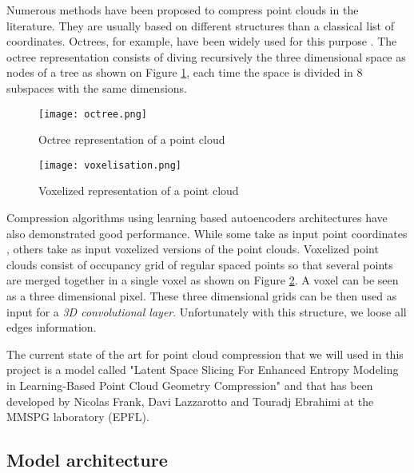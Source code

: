 \label{sec:pcc}

Numerous methods have been proposed to compress point clouds in the literature. They are usually based on different structures than a classical list of coordinates.                                
Octrees, for example, have been widely used for this purpose \cite{bib:octree}. 
The octree representation consists of diving recursively the three dimensional space as nodes of a tree as shown on Figure \ref{fig:octree}, each time the space is divided in 8 subspaces with the same dimensions.

\begin{figure}
    \centering
    \texttt{[image: octree.png]}
    \caption{Octree representation of a point cloud}
    \label{fig:octree}
\end{figure}

\begin{figure}
    \centering
    \texttt{[image: voxelisation.png]}
    \caption{Voxelized representation of a point cloud}
    \label{fig:voxelized}
\end{figure}

Compression algorithms using learning based autoencoders architectures have also demonstrated good performance. While some take as input point coordinates \cite{bib:9102866}, others take as input voxelized versions of the point clouds. 
Voxelized point clouds consist of occupancy grid of regular spaced points so that several points are merged together in a single voxel as shown on Figure \ref{fig:voxelized}.
A voxel can be seen as a three dimensional pixel.
These three dimensional grids can be then used as input for a \textit{3D convolutional layer}. 
Unfortunately with this structure, we loose all edges information.


The current state of the art for point cloud compression that we will used in this project is a model called "Latent Space Slicing For Enhanced Entropy Modeling in Learning-Based Point Cloud Geometry Compression" and that has been developed by Nicolas Frank, Davi Lazzarotto and Touradj Ebrahimi at the MMSPG laboratory (EPFL).

\subsection{Model architecture}
\label{subsec:model-architecture}

